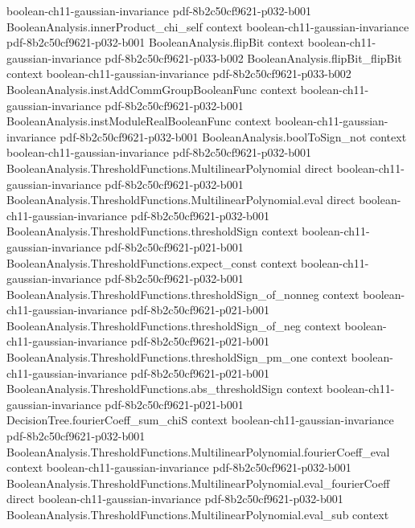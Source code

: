 \begin{lemma}
  {boolean-ch11-gaussian-invariance}
  {pdf-8b2c50cf9621-p032-b001}
\proofstep
  {BooleanAnalysis.innerProduct_chi_self}
  {context}
  {boolean-ch11-gaussian-invariance}
  {pdf-8b2c50cf9621-p032-b001}
\proofstep
  {BooleanAnalysis.flipBit}
  {context}
  {boolean-ch11-gaussian-invariance}
  {pdf-8b2c50cf9621-p033-b002}
\proofstep
  {BooleanAnalysis.flipBit_flipBit}
  {context}
  {boolean-ch11-gaussian-invariance}
  {pdf-8b2c50cf9621-p033-b002}
\proofstep
  {BooleanAnalysis.instAddCommGroupBooleanFunc}
  {context}
  {boolean-ch11-gaussian-invariance}
  {pdf-8b2c50cf9621-p032-b001}
\proofstep
  {BooleanAnalysis.instModuleRealBooleanFunc}
  {context}
  {boolean-ch11-gaussian-invariance}
  {pdf-8b2c50cf9621-p032-b001}
\proofstep
  {BooleanAnalysis.boolToSign_not}
  {context}
  {boolean-ch11-gaussian-invariance}
  {pdf-8b2c50cf9621-p032-b001}
\proofstep
  {BooleanAnalysis.ThresholdFunctions.MultilinearPolynomial}
  {direct}
  {boolean-ch11-gaussian-invariance}
  {pdf-8b2c50cf9621-p032-b001}
\proofstep
  {BooleanAnalysis.ThresholdFunctions.MultilinearPolynomial.eval}
  {direct}
  {boolean-ch11-gaussian-invariance}
  {pdf-8b2c50cf9621-p032-b001}
\proofstep
  {BooleanAnalysis.ThresholdFunctions.thresholdSign}
  {context}
  {boolean-ch11-gaussian-invariance}
  {pdf-8b2c50cf9621-p021-b001}
\proofstep
  {BooleanAnalysis.ThresholdFunctions.expect_const}
  {context}
  {boolean-ch11-gaussian-invariance}
  {pdf-8b2c50cf9621-p032-b001}
\proofstep
  {BooleanAnalysis.ThresholdFunctions.thresholdSign_of_nonneg}
  {context}
  {boolean-ch11-gaussian-invariance}
  {pdf-8b2c50cf9621-p021-b001}
\proofstep
  {BooleanAnalysis.ThresholdFunctions.thresholdSign_of_neg}
  {context}
  {boolean-ch11-gaussian-invariance}
  {pdf-8b2c50cf9621-p021-b001}
\proofstep
  {BooleanAnalysis.ThresholdFunctions.thresholdSign_pm_one}
  {context}
  {boolean-ch11-gaussian-invariance}
  {pdf-8b2c50cf9621-p021-b001}
\proofstep
  {BooleanAnalysis.ThresholdFunctions.abs_thresholdSign}
  {context}
  {boolean-ch11-gaussian-invariance}
  {pdf-8b2c50cf9621-p021-b001}
\proofstep
  {DecisionTree.fourierCoeff_sum_chiS}
  {context}
  {boolean-ch11-gaussian-invariance}
  {pdf-8b2c50cf9621-p032-b001}
\proofstep
  {BooleanAnalysis.ThresholdFunctions.MultilinearPolynomial.fourierCoeff_eval}
  {context}
  {boolean-ch11-gaussian-invariance}
  {pdf-8b2c50cf9621-p032-b001}
\proofstep
  {BooleanAnalysis.ThresholdFunctions.MultilinearPolynomial.eval_fourierCoeff}
  {direct}
  {boolean-ch11-gaussian-invariance}
  {pdf-8b2c50cf9621-p032-b001}
\proofstep
  {BooleanAnalysis.ThresholdFunctions.MultilinearPolynomial.eval_sub}
  {context}

\end{lemma}
